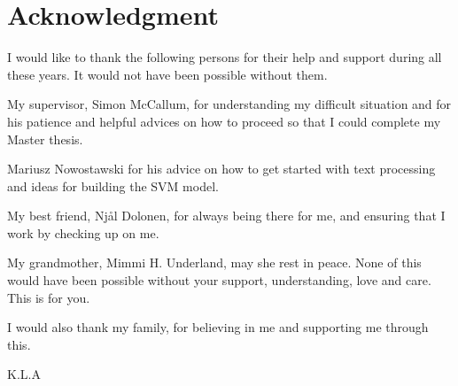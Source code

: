 \chapter*{Acknowledgment}
I would like to thank the following persons for their help and support during all these years. It would not have been possible without them.

My supervisor, Simon McCallum, for understanding my difficult situation and for his patience and helpful advices on how to proceed so that I could complete my Master thesis.

Mariusz Nowostawski for his advice on how to get started with text processing and ideas for building the SVM model. 

My best friend, Njål Dolonen, for always being there for me, and ensuring that I work by checking up on me.

My grandmother, Mimmi H. Underland, may she rest in peace. None of this would have been possible without your support, understanding, love and care. This is for you.

I would also thank my family, for believing in me and supporting me through this.

\begin{flushright}
K.L.A
\end{flushright}